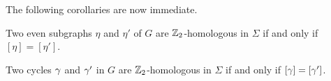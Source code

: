 The following corollaries are now immediate.

\begin{corollary}
Two even subgraphs $\eta$ and $\eta'$ of $G$ are $\mathbb{Z}_2$-homologous in $\Sigma$ if and only if $[\eta] = [\eta']$.
\end{corollary}

\begin{corollary}
Two cycles $\gamma$ and $\gamma'$ in $G$ are $\mathbb{Z}_2$-homologous in $\Sigma$ if and only if $[\gamma] = [\gamma']$.
\end{corollary}
